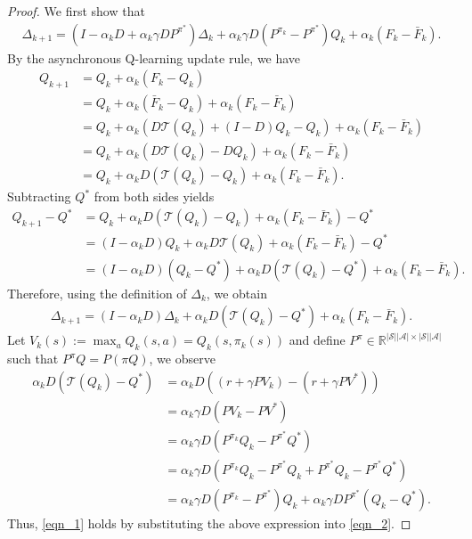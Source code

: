 \documentclass[10pt,a4paper]{amsart}
\begin{document}
\begin{proof}
We first show that
\begin{align}
\Delta_{k+1} = (I - \alpha_kD + \alpha_k \gamma D P^{\pi^*})\Delta_k + \alpha_k \gamma D(P^{\pi_k}-P^{\pi^*} )Q_k  + \alpha_k(F_k - \bar{F}_k). \label{eqn_1}
\end{align}
By the asynchronous Q-learning update rule, we have
\begin{align*}
Q_{k+1} &= Q_{k} + \alpha_k(F_k - Q_k)\\
&= Q_k + \alpha_k(\bar{F}_k - Q_k) + \alpha_k(F_k - \bar{F}_k)\\
&= Q_k + \alpha_k(D \mathcal{T}(Q_k) + (I-D) Q_k - Q_k) + \alpha_k(F_k - \bar{F}_k)\\
&= Q_k + \alpha_k(D \mathcal{T}(Q_k) - DQ_k) + \alpha_k(F_k - \bar{F}_k)\\
&= Q_k + \alpha_kD(\mathcal{T}(Q_k) - Q_k) + \alpha_k(F_k - \bar{F}_k).
\end{align*}
Subtracting $Q^*$ from both sides yields
\begin{align*}
Q_{k+1} - Q^* &= Q_k + \alpha_kD(\mathcal{T}(Q_k) - Q_k) + \alpha_k(F_k - \bar{F}_k) - Q^*\\
&= (I - \alpha_kD) Q_k + \alpha_kD\mathcal{T}(Q_k)  + \alpha_k(F_k - \bar{F}_k) - Q^*\\
&= (I - \alpha_kD) (Q_k - Q^*)+ \alpha_kD(\mathcal{T}(Q_k) - Q^*)  + \alpha_k(F_k - \bar{F}_k).
\end{align*}
Therefore, using the definition of $\Delta_k$, we obtain
\begin{align}
\Delta_{k+1} = (I - \alpha_kD)\Delta_k + \alpha_kD(\mathcal{T}(Q_k) - Q^*)  + \alpha_k(F_k - \bar{F}_k). \label{eqn_2}
\end{align}
Let $V_k(s) := \max_a Q_k(s,a) = Q_k(s,\pi_k(s))$ and define $P^{\pi} \in \mathbb{R}^{|\mathcal{S}||\mathcal{A}|\times |\mathcal{S}||\mathcal{A}|}$ such that $P^{\pi}Q=P(\pi Q)$, we observe
\begin{align*}
\alpha_kD(\mathcal{T}(Q_k) - Q^*) &= \alpha_kD( (r+ \gamma PV_k) - (r + \gamma PV^*))\\
&=\alpha_k \gamma D(PV_k -PV^*)\\
&=\alpha_k \gamma D(P^{\pi_k}Q_k - P^{\pi^*}Q^*)\\
&=\alpha_k \gamma D(P^{\pi_k}Q_k - P^{\pi^*} Q_k + P^{\pi^*} Q_k - P^{\pi^*}Q^*)\\
&=\alpha_k \gamma D(P^{\pi_k}-P^{\pi^*} )Q_k  + \alpha_k \gamma D P^{\pi^*} (Q_k - Q^*).
\end{align*}
Thus, \cref{eqn_1} holds by substituting the above expression into \cref{eqn_2}.


\end{proof}
\end{document}
